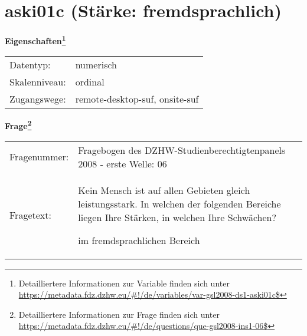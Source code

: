 
    \setcounter{footnote}{0}

    \vspace*{-1.8cm}
	\section{aski01c (Stärke: fremdsprachlich)}
	\label{section:aski01c}



    \vspace*{0.5cm}
    \noindent\textbf{Eigenschaften\footnote{Detailliertere Informationen zur Variable finden sich unter
		\url{https://metadata.fdz.dzhw.eu/\#!/de/variables/var-gsl2008-ds1-aski01c$}}}\\
	\begin{tabularx}{\hsize}{@{}lX}
	Datentyp: & numerisch \\
	Skalenniveau: & ordinal \\
	Zugangswege: &
	  remote-desktop-suf, 
	  onsite-suf
 \\
    \end{tabularx}



				\vspace*{0.5cm}
                \noindent\textbf{Frage\footnote{Detailliertere Informationen zur Frage finden sich unter
		              \url{https://metadata.fdz.dzhw.eu/\#!/de/questions/que-gsl2008-ins1-06$}}}\\
				\begin{tabularx}{\hsize}{@{}lX}
					Fragenummer: &
					  Fragebogen des DZHW-Studienberechtigtenpanels 2008 - erste Welle:
					  06
 \\
					Fragetext: & Kein Mensch ist auf allen Gebieten gleich leistungsstark. In welchen der folgenden Bereiche liegen Ihre Stärken, in welchen Ihre Schwächen?\par  im fremdsprachlichen Bereich \\
				\end{tabularx}





